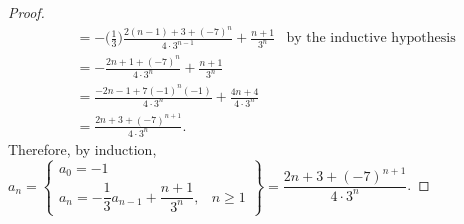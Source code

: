\documentclass{article}
\begin{document}
\begin{enumerate}
{\begin{minipage}[t]{0.98\textwidth}
\begin{proof}
\begin{align*}
                &= -\bigg(\frac{1}{3}\bigg) \frac{2(n-1)+3+{(-7)}^n}{4\cdot 3^{n-1}} + \frac{n+1}{3^n} &\text{by the inductive hypothesis} \\
                &= - \frac{2n+1+{(-7)}^n}{4\cdot 3^n} + \frac{n+1}{3^n} \\ 
                &= \frac{-2n-1+7{(-1)}^n{(-1)}}{4\cdot 3^n } + \frac{4n+4}{4\cdot 3^n} \\
                &= \frac{2n+3+{(-7)}^{n+1}}{4\cdot 3^n}.  
            \end{align*} Therefore, by induction, $a_n = \left. \begin{cases} a_0 = -1 & \\ a_n = -\dfrac{1}{3}a_{n-1} + \dfrac{n+1}{3^n},&n\geq 1 \end{cases} \right\} = \dfrac{2n+3+{(-7)}^{n+1}}{4\cdot 3^n}$.
        \end{proof} 
    \end{minipage}
    }
\end{enumerate} 
\end{document}
